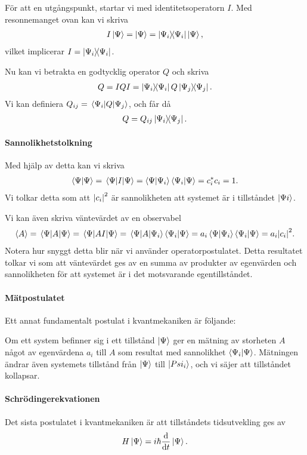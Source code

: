 För att en utgångspunkt, startar vi med identitetsoperatorn $I$. Med resonnemanget ovan kan vi skriva
\begin{align*}
	I\ket{\Psi} = \ket{\Psi} = \op{\Psi_{i}}{\Psi_{i}}\ket{\Psi},
\end{align*}
vilket implicerar $I = \op{\Psi_{i}}{\Psi_{i}}$.

Nu kan vi betrakta en godtycklig operator $Q$ och skriva
\begin{align*}
	Q = IQI = \op{\Psi_{i}}{\Psi_{i}}Q\op{\Psi_{j}}{\Psi_{j}}.
\end{align*}
Vi kan definiera $Q_{ij} = \mel{\Psi_{i}}{Q}{\Psi_{j}}$, och får då
\begin{align*}
	Q = Q_{ij}\op{\Psi_{i}}{\Psi_{j}}.
\end{align*}

\paragraph{Sannolikhetstolkning}
Med hjälp av detta kan vi skriva
\begin{align*}
	\braket{\Psi} = \ev{I}{\Psi} = \braket{\Psi}{\Psi_{i}}\braket{\Psi_{i}}{\Psi} = \cc{c_{i}}c_{i} = 1.
\end{align*}
Vi tolkar detta som att $\abs{c_{i}}^{2}$ är sannolikheten att systemet är i tillståndet $\ket{\Psi{i}}$.

Vi kan även skriva väntevärdet av en observabel
\begin{align*}
	\expval{A} = \ev{A}{\Psi} = \ev{AI}{\Psi} = \mel{\Psi}{A}{\Psi_{i}}\braket{\Psi_{i}}{\Psi} = a_{i}\braket{\Psi}{\Psi_{i}}\braket{\Psi_{i}}{\Psi} = a_{i}\abs{c_{i}}^{2}.
\end{align*}
Notera hur snyggt detta blir när vi använder operatorpostulatet. Detta resultatet tolkar vi som att väntevärdet ges av en summa av produkter av egenvärden och sannolikheten för att systemet är i det motsvarande egentillståndet.

\paragraph{Mätpostulatet}
Ett annat fundamentalt postulat i kvantmekaniken är följande:

Om ett system befinner sig i ett tillstånd $\ket{\Psi}$ ger en mätning av storheten $A$ något av egenvärdena $a_{i}$ till $A$ som resultat med sannolikhet $\braket{\Psi_{i}}{\Psi}$. Mätningen ändrar även systemets tillstånd från $\ket{\Psi}$ till $\ket{Psi_{i}}$, och vi säjer att tillståndet kollapsar.

\paragraph{Schrödingerekvationen}
Det sista postulatet i kvantmekaniken är att tillståndets tidsutvekling ges av
\begin{align*}
	H\ket{\Psi} = i\hbar\dv{t}\ket{\Psi}.
\end{align*}